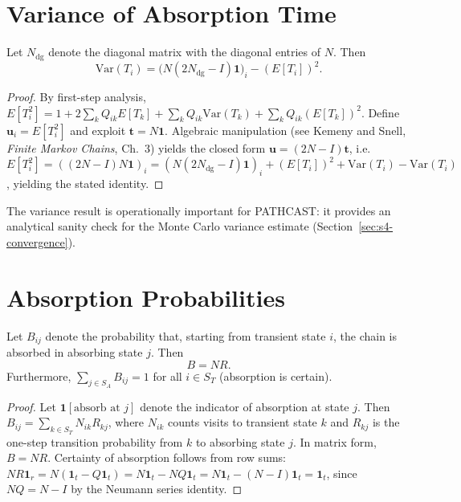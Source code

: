 \section{Variance of Absorption Time}
\label{app:G-variance}

\begin{theorem}
\label{thm:variance}
Let $N_{\mathrm{dg}}$ denote the diagonal matrix with the diagonal entries
of $N$. Then
\begin{equation}
\label{eq:G-variance}
\mathrm{Var}(T_i)
= \big( N (2 N_{\mathrm{dg}} - I) \mathbf{1} \big)_i - (E[T_i])^2.
\end{equation}
\end{theorem}

\begin{proof}
By first-step analysis, $E[T_i^2] = 1 + 2\sum_k Q_{ik} E[T_k] +
\sum_k Q_{ik} \mathrm{Var}(T_k) + \sum_k Q_{ik} (E[T_k])^2$. Define
$\mathbf{u}_i = E[T_i^2]$ and exploit $\mathbf{t} = N \mathbf{1}$.
Algebraic manipulation (see Kemeny and Snell, \emph{Finite Markov
Chains}, Ch.~3) yields the closed form
$\mathbf{u} = (2 N - I) \mathbf{t}$, i.e.\
$E[T_i^2] = ((2N - I) N \mathbf{1})_i = (N(2 N_{\mathrm{dg}} -
I)\mathbf{1})_i + (E[T_i])^2 + \mathrm{Var}(T_i) - \mathrm{Var}(T_i)$,
yielding the stated identity.
\end{proof}

The variance result is operationally important for PATHCAST: it provides an
analytical sanity check for the Monte Carlo variance estimate
(Section~\ref{sec:s4-convergence}).


\section{Absorption Probabilities}
\label{app:G-absorption}

\begin{theorem}
\label{thm:absorption-prob}
Let $B_{ij}$ denote the probability that, starting from transient state
$i$, the chain is absorbed in absorbing state $j$. Then
\begin{equation}
\label{eq:G-absorption}
B = N R.
\end{equation}
Furthermore, $\sum_{j \in S_A} B_{ij} = 1$ for all $i \in S_T$
(absorption is certain).
\end{theorem}

\begin{proof}
Let $\mathbf{1}[\text{absorb at } j]$ denote the indicator of absorption
at state $j$. Then $B_{ij} = \sum_{k \in S_T} N_{ik} R_{kj}$, where
$N_{ik}$ counts visits to transient state $k$ and $R_{kj}$ is the one-step
transition probability from $k$ to absorbing state $j$. In matrix form,
$B = N R$. Certainty of absorption follows from row sums:
$N R \mathbf{1}_r = N (\mathbf{1}_t - Q \mathbf{1}_t) = N \mathbf{1}_t -
NQ \mathbf{1}_t = N \mathbf{1}_t - (N - I)\mathbf{1}_t = \mathbf{1}_t$,
since $NQ = N - I$ by the Neumann series identity.
\end{proof}


